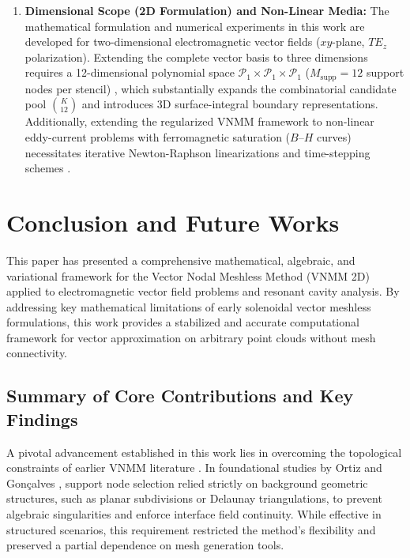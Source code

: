 \documentclass[preprint,12pt]{elsarticle}
\begin{document}
\begin{enumerate}
    \item \textbf{Dimensional Scope (2D Formulation) and Non-Linear Media:} 
    The mathematical formulation and numerical experiments in this work are developed for two-dimensional electromagnetic vector fields ($xy$-plane, $TE_z$ polarization). Extending the complete vector basis to three dimensions requires a 12-dimensional polynomial space $\mathcal{P}_1 \times \mathcal{P}_1 \times \mathcal{P}_1$ ($M_{\mathrm{supp}} = 12$ support nodes per stencil) \cite{goncalves2023vector}, which substantially expands the combinatorial candidate pool $\binom{K}{12}$ and introduces 3D surface-integral boundary representations. Additionally, extending the regularized VNMM framework to non-linear eddy-current problems with ferromagnetic saturation ($B\text{--}H$ curves) necessitates iterative Newton-Raphson linearizations and time-stepping schemes \cite{tsukerman1992overlapping, coppoli2012induction}.
\end{enumerate}

\section{Conclusion and Future Works}
\label{sec:conclusion}

This paper has presented a comprehensive mathematical, algebraic, and variational framework for the Vector Nodal Meshless Method (VNMM 2D) applied to electromagnetic vector field problems and resonant cavity analysis. By addressing key mathematical limitations of early solenoidal vector meshless formulations, this work provides a stabilized and accurate computational framework for vector approximation on arbitrary point clouds without mesh connectivity.

\subsection{Summary of Core Contributions and Key Findings}
\label{subsec:summary_contributions}

A pivotal advancement established in this work lies in overcoming the topological constraints of earlier VNMM literature \cite{ortiz2023tese, goncalves2025tese}. In foundational studies by Ortiz \cite{ortiz2023tese} and Gonçalves \cite{goncalves2025tese}, support node selection relied strictly on background geometric structures, such as planar subdivisions or Delaunay triangulations, to prevent algebraic singularities and enforce interface field continuity. While effective in structured scenarios, this requirement restricted the method's flexibility and preserved a partial dependence on mesh generation tools. 
\end{document}
